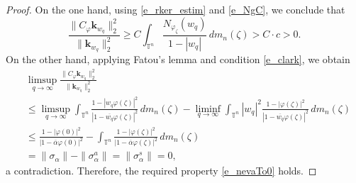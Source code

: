 \documentclass{amsart}
\numberwithin{equation}{section}
\theoremstyle{definition}
\newcommand{\al}{\alpha}
\newcommand{\clk}{\sigma}
\newcommand{\neva}{N}
\newcommand{\meal}{m_n}
\newcommand{\za}{\zeta}
\newcommand{\ph}{\varphi}
\newcommand{\cph}{C_\varphi}
\newcommand{\tn}{\mathbb{T}^n}
\newcommand{\kknl}{\mathbf{k}}
\begin{document}
\begin{proof}
On the one hand, using \eqref{e_rker_estim} and \eqref{e_NgC}, we conclude that
\[
\frac{\|\cph \kknl_{w_q}\|_2^2}{\|\kknl_{w_q}\|_2^2}
\ge C \int_{\tn} \frac{\neva_{\ph_\za}(w_q)}{1-|w_q|}\, d\meal(\za) > C\cdot c > 0.
\]
On the other hand, applying Fatou's lemma and condition \eqref{e_clark}, we obtain
\[
\begin{split}
   &\limsup_{q\to \infty} \frac{\|\cph \kknl_{w_q}\|_2^2}{\|\kknl_{w_q}\|_2^2}
   \\
&\le \limsup_{q\to \infty} \int_{\tn} \frac{1-|w_q\ph(\za)|^2}{|1- \overline{w_q}\ph(\za)|^2} \, d\meal(\za)
- \liminf_{q\to \infty} \int_{\tn} |w_q|^2 \frac{1-|\ph(\za)|^2}{|1- \overline{w_q}\ph(\za) |^2}\, d\meal(\za) \\
&\le \frac{1-|\ph(0)|^2}{|1- \overline{\al}\ph(0)|^2}
- \int_{\tn} \frac{1-|\ph(\za)|^2}{|1- \overline{\al}\ph(\za) |^2}\, d\meal(\za) \\
     &= \|\clk_\al\| - \|\clk_\al^a\| = \|\clk_\al^s\| =0,
\end{split}
\]
a contradiction. Therefore, the required property \eqref{e_nevaTo0} holds.
\end{proof}
\end{document}
